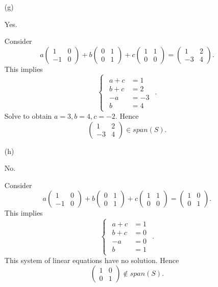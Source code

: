 \begin{Exercise}
\begin{enumerate}[(a)]
\item[(g)]
\begin{answer}
Yes.
\end{answer}
\begin{solution}
Consider
$$
a\begin{pmatrix}
1 & 0 \\
-1 & 0
\end{pmatrix} + b\begin{pmatrix}
0 & 1 \\
0 & 1
\end{pmatrix} + c\begin{pmatrix}
1 & 1 \\
0 & 0
\end{pmatrix} = \begin{pmatrix}
1 & 2 \\
-3 & 4
\end{pmatrix}.
$$
This implies
$$
\begin{cases}
\begin{aligned}
a+c &= 1 \\
b+c &= 2 \\
-a &= -3 \\
b &= 4
\end{aligned}
\end{cases}.
$$
Solve to obtain $a=3,b=4,c=-2$. Hence
$$
\begin{pmatrix}
1 & 2 \\
-3 & 4
\end{pmatrix} \in span(S).
$$
\end{solution}

\item[(h)]
\begin{answer}
No.
\end{answer}
\begin{solution}
Consider
$$
a\begin{pmatrix}
1 & 0 \\
-1 & 0
\end{pmatrix} + b\begin{pmatrix}
0 & 1 \\
0 & 1
\end{pmatrix} + c\begin{pmatrix}
1 & 1 \\
0 & 0
\end{pmatrix} = \begin{pmatrix}
1 & 0 \\
0 & 1
\end{pmatrix}.
$$
This implies
$$
\begin{cases}
\begin{aligned}
a+c &= 1 \\
b+c &= 0 \\
-a &= 0 \\
b &= 1
\end{aligned}
\end{cases}.
$$
This system of linear equations have no solution. Hence 
$$
\begin{pmatrix}
1 & 0 \\
0 & 1
\end{pmatrix} \notin span(S).
$$
\end{solution}
\end{enumerate}
\end{Exercise}